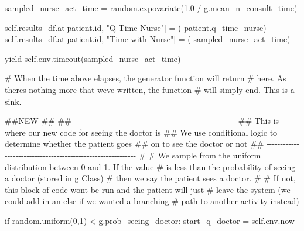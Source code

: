 \documentclass[
  letterpaper,
  DIV=11,
  numbers=noendperiod]{scrreprt}
\newenvironment{Shaded}{\begin{snugshade}}{\end{snugshade}}
\newcommand{\BuiltInTok}[1]{\textcolor[rgb]{0.00,0.23,0.31}{#1}}
\newcommand{\CommentTok}[1]{\textcolor[rgb]{0.37,0.37,0.37}{#1}}
\newcommand{\ControlFlowTok}[1]{\textcolor[rgb]{0.00,0.23,0.31}{#1}}
\newcommand{\DecValTok}[1]{\textcolor[rgb]{0.68,0.00,0.00}{#1}}
\newcommand{\FloatTok}[1]{\textcolor[rgb]{0.68,0.00,0.00}{#1}}
\newcommand{\NormalTok}[1]{\textcolor[rgb]{0.00,0.23,0.31}{#1}}
\newcommand{\OperatorTok}[1]{\textcolor[rgb]{0.37,0.37,0.37}{#1}}
\newcommand{\StringTok}[1]{\textcolor[rgb]{0.13,0.47,0.30}{#1}}
\newcommand{\VariableTok}[1]{\textcolor[rgb]{0.07,0.07,0.07}{#1}}
\begin{document}
\begin{Shaded}
\begin{Highlighting}[]
\NormalTok{            sampled\_nurse\_act\_time }\OperatorTok{=}\NormalTok{ random.expovariate(}\FloatTok{1.0} \OperatorTok{/}
\NormalTok{                                                        g.mean\_n\_consult\_time)}

            \VariableTok{self}\NormalTok{.results\_df.at[patient.}\BuiltInTok{id}\NormalTok{, }\StringTok{"Q Time Nurse"}\NormalTok{] }\OperatorTok{=}\NormalTok{ (}
\NormalTok{                patient.q\_time\_nurse)}
            \VariableTok{self}\NormalTok{.results\_df.at[patient.}\BuiltInTok{id}\NormalTok{, }\StringTok{"Time with Nurse"}\NormalTok{] }\OperatorTok{=}\NormalTok{ (}
\NormalTok{                sampled\_nurse\_act\_time)}

            \ControlFlowTok{yield} \VariableTok{self}\NormalTok{.env.timeout(sampled\_nurse\_act\_time)}

            \CommentTok{\# When the time above elapses, the generator function will return}
            \CommentTok{\# here.  As there\textquotesingle{}s nothing more that we\textquotesingle{}ve written, the function}
            \CommentTok{\# will simply end.  This is a sink.}

        \CommentTok{\#\#NEW}
        \CommentTok{\#\#}
        \CommentTok{\#\# {-}{-}{-}{-}{-}{-}{-}{-}{-}{-}{-}{-}{-}{-}{-}{-}{-}{-}{-}{-}{-}{-}{-}{-}{-}{-}{-}{-}{-}{-}{-}{-}{-}{-}{-}{-}{-}{-}{-}{-}{-}{-}{-}{-}{-}{-}{-}{-}{-}{-}{-}{-}{-}{-}{-}{-}{-}{-}{-}}
        \CommentTok{\#\# This is where our new code for seeing the doctor is}
        \CommentTok{\#\# We use conditional logic to determine whether the patient goes}
        \CommentTok{\#\# on to see the doctor or not}
        \CommentTok{\#\# {-}{-}{-}{-}{-}{-}{-}{-}{-}{-}{-}{-}{-}{-}{-}{-}{-}{-}{-}{-}{-}{-}{-}{-}{-}{-}{-}{-}{-}{-}{-}{-}{-}{-}{-}{-}{-}{-}{-}{-}{-}{-}{-}{-}{-}{-}{-}{-}{-}{-}{-}{-}{-}{-}{-}{-}{-}{-}{-}{-}}
        \CommentTok{\#}
        \CommentTok{\# We sample from the uniform distribution between 0 and 1.  If the value}
        \CommentTok{\# is less than the probability of seeing a doctor (stored in g Class)}
        \CommentTok{\# then we say the patient sees a doctor.}
        \CommentTok{\#}
        \CommentTok{\# If not, this block of code won\textquotesingle{}t be run and the patient will just}
        \CommentTok{\# leave the system (we could add in an else if we wanted a branching}
        \CommentTok{\# path to another activity instead)}

        \ControlFlowTok{if}\NormalTok{ random.uniform(}\DecValTok{0}\NormalTok{,}\DecValTok{1}\NormalTok{) }\OperatorTok{\textless{}}\NormalTok{ g.prob\_seeing\_doctor:}
\NormalTok{            start\_q\_doctor }\OperatorTok{=} \VariableTok{self}\NormalTok{.env.now}


\end{Highlighting}
\end{Shaded}
\end{document}
